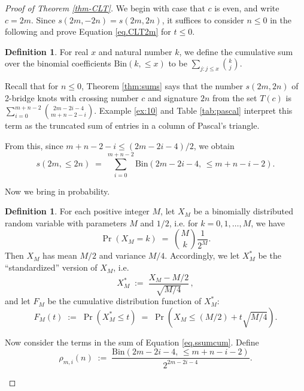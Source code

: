 \documentclass[11pt]{amsart}
\theoremstyle{definition}
\newtheorem{definition}[theorem]{Definition}
\theoremstyle{remark}
\numberwithin{equation}{section}
\begin{document}
\begin{proof}[Proof of Theorem \ref{thm-CLT}]
We begin with case that $c$ is even, and write $c=2m$.  
Since $s(2m,-2n)=s(2m,2n)$, it suffices to consider $n\leq 0$ in the following and prove Equation \eqref{eq.CLT2m}
for $t\leq 0$.


\begin{definition}
For real $x$ and natural number $k$, we define the cumulative sum over the binomial coefficients $\mbox{Bin}(k,\leq x)$ to be $\sum_{j:j\leq x}  \binom{k }{j}$.
\end{definition}

Recall that for $n\leq 0$, Theorem \ref{thm:sums} says that the number $s(2m,2n)$ of 2-bridge knots with crossing number $c$ and signature $2n$ from the set $T(c)$ is $\sum_{i=0}^{m+n-2}   \binom{ 2m-2i-4}{m+n-2-i}.$    
Example \ref{ex:10} and Table \ref{tab:pascal} interpret this term as the truncated sum of entries in a column of Pascal's triangle.  

From this, since $m+n-2-i\leq (2m-2i-4)/2$, we obtain
\begin{equation}
   \label{eq.ssumcum}
   s(2m,\leq 2n)   \;= \;   \sum_{i=0}^{m+n-2}  \mbox{Bin}\left(2m-2i-4,\,\leq m+n-i-2\right).
\end{equation}

Now we bring in probability.  

\begin{definition}
    For each positive integer $M$, let $X_M$ be a binomially distributed random variable with 
parameters $M$ and $1/2$, i.e.  for $k=0,1,\ldots,M$, we have
\begin{equation}
    \label{eq.XNdef} 
       \Pr(X_M=k)  \;=\;  \binom{M}{k}  \frac{1}{2^{M}}.
\end{equation}
Then $X_M$ has mean $M/2$ and variance $M/4$.  Accordingly, we let $X_M^*$ be the ``standardized'' version of $X_M$, 
i.e.
\[     X_M^*  \; :=\;   \frac{X_M-M/2}{\sqrt{M/4}}  \,,
\] 
and let $F_M$ be the cumulative distribution function of $X_M^*$:
\begin{equation}
   \label{eq.FNdef}
       F_M(t)  \;:=\;  \Pr(X_M^*\leq t)   \;=\;  \Pr\left(X_M\leq  (M/2)+t\sqrt{M/4}\right).
\end{equation}

Now consider the terms in the sum of Equation \eqref{eq.ssumcum}.  
Define
\begin{equation}
   \label{eq.rhodef}
       \rho_{m,i}(n)   \; :=\;   \frac{ \mbox{Bin}(2m-2i-4,\,\leq m+n-i-2)}{2^{2m-2i-4}}.
\end{equation}
\end{definition}


\end{proof}
\end{document}
